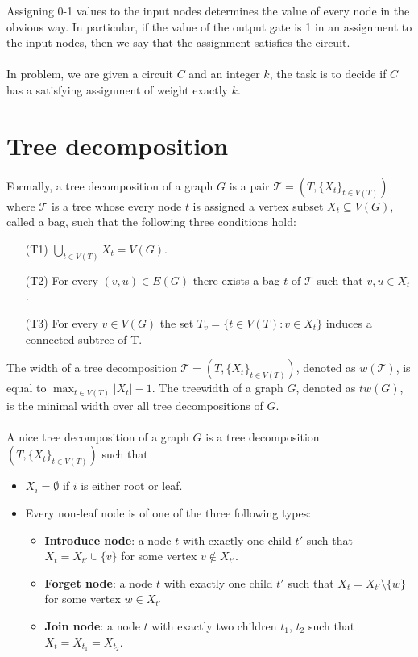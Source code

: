 \documentclass[en]{pracamgr}
\newcommand{\wcs}{Weighted Circuit Satisfiability}
\begin{document}
Assigning 0-1 values to the input nodes determines the value of every node in the obvious way. In particular, if the value of the output gate is 1 in an assignment to the input nodes, then we say that the assignment satisfies the circuit.
\\\\
In {\sc{\wcs}} problem, we are given a circuit $C$ and an integer $k$, the task is to decide if $C$ has a satisfying assignment of weight exactly $k$.

\section{Tree decomposition}

Formally, a tree decomposition of a graph $G$ is a pair $\mathcal{T} = (T, \{X_t\}_{t\in V(T)})$ where $\mathcal{T}$ is a tree whose every node $t$ is assigned a vertex subset $X_t \subseteq V(G)$, called a bag, such that the following three conditions hold:
\begin{itemize}
	\item[(T1)] $\bigcup_{t\in V(T)}X_t = V(G)$.
	\item[(T2)] For every $(v,u) \in E(G)$ there exists a bag $t$ of $\mathcal{T}$ such that $v,u \in X_t$.
	\item[(T3)] For every $v \in V(G)$ the set $T_v = \{t \in V(T): v \in X_t\}$ induces a connected subtree of T.
\end{itemize}

The width of a tree decomposition $\mathcal{T} = (T,\{X_t\}_{t\in V(T)})$, denoted as $w(\mathcal{T})$, is equal to $\max_{t \in V(T)} |X_t| - 1$. The treewidth of a graph $G$, denoted as $tw(G)$, is the minimal width over all tree decompositions of $G$.
\\\\
A nice tree decomposition of a graph $G$ is a tree decomposition $(T, \{X_t\}_{t \in V(T)})$ such that
\begin{itemize}
	\item $X_i = \emptyset$ if $i$ is either root or leaf.
	\item Every non-leaf node is of one of the three following types:
	\begin{itemize}
		\item \textbf{Introduce node}: a node $t$ with exactly one child $t'$ such that $X_t = X_{t'} \cup \{v\}$ for some vertex $v \notin X_{t'}$.
		\item \textbf{Forget node}: a node $t$ with exactly one child $t'$ such that $X_t = X_{t'} \setminus \{w\}$ for some vertex $w \in X_{t'}$
		\item \textbf{Join node}: a node $t$ with exactly two children $t_1$, $t_2$ such that $X_t = X_{t_1} = X_{t_2}$.
	\end{itemize}
\end{itemize}
\end{document}
